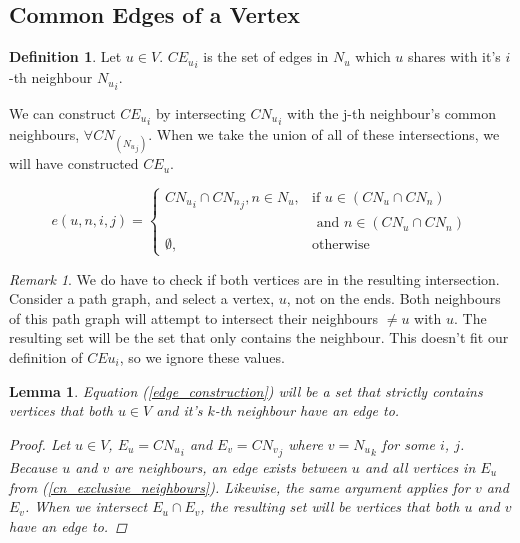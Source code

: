 \documentclass{article}
\theoremstyle{plain}
\newtheorem{lem}[thm]{Lemma}
\theoremstyle{definition}
\newtheorem{defn}{Definition}[]
\theoremstyle{remark}
\newtheorem*{rem}{Remark}
\newcommand{\cn}[1]{ {{CN}_{#1}} }
\newcommand{\ce}[1]{ {{CE}_{#1}} }
\newcommand{\nev}[1]{ {N_{#1}} }
\begin{document}
\subsection{Common Edges of a Vertex}

\begin{defn}
    Let \(u \in V\). \(\ce{u}_i\) is the set of edges in \(\nev{u}\) which \(u\) shares
    with it's \(i\)-th neighbour \({\nev{u}}_i\).
\end{defn}

We can construct \(\ce{u}_i\) by intersecting \(\cn{u}_i\) with the j-th neighbour's
common neighbours, \(\forall \cn{(\nev{u}_j)}\). When we take the union of all of these
intersections, we will have constructed \(\ce{u}\).

\begin{equation}
    e(u, n, i, j) =
    \begin{cases}
        \cn{u}_i \cap {\cn{n}}_j,n \in \nev{u},&
            \text{if } u \in (\cn{u} \cap \cn{n}) \\
            & \text{ and } n \in (\cn{u} \cap \cn{n})
        \\
        \emptyset,& \text{otherwise}
    \end{cases}
    \label{edge_construction}
\end{equation}

\begin{rem}
    We do have to check if both vertices are in the resulting intersection. Consider a
    path graph, and select a vertex, \(u\), not on the ends. Both neighbours of this path
    graph will attempt to intersect their neighbours \(\neq u\) with \(u\). The resulting
    set will be the set that only contains the neighbour. This doesn't fit our definition
    of \(CE{u}_i\), so we ignore these values.
\end{rem}

\begin{lem}
    Equation (\ref{edge_construction}) will be a set that strictly contains vertices that
    both \(u \in V\) and it's \(k\)-th neighbour have an edge to.
    \begin{proof}
        Let \(u \in V\), \(E_u = \cn{u}_i\) and \(E_v = \cn{v}_j\) where \(v = \nev{u}_k\)
        for some \(i\), \(j\). Because \(u\) and \(v\) are neighbours, an edge exists
        between \(u\) and all vertices in \(E_u\) from (\ref{cn_exclusive_neighbours}).
        Likewise, the same argument applies for \(v\) and \(E_v\). When we intersect
        \(E_u \cap E_v\), the resulting set will be vertices that both \(u\) and \(v\)
        have an edge to.
    \end{proof}
    \label{unique_edges}
\end{lem}
\end{document}
